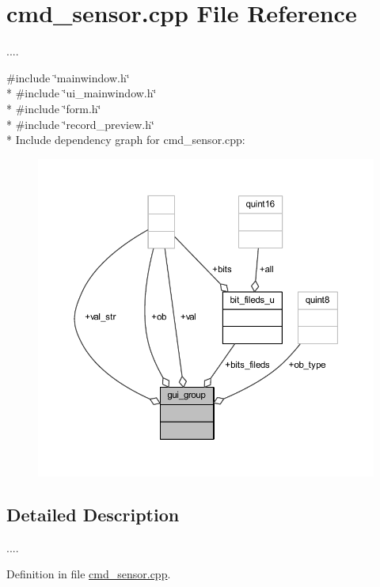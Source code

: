 \hypertarget{a00085}{\section{cmd\+\_\+sensor.\+cpp File Reference}
\label{a00085}
}


....  


{\ttfamily \#include \char`\"{}mainwindow.\+h\char`\"{}}\\*
{\ttfamily \#include \char`\"{}ui\+\_\+mainwindow.\+h\char`\"{}}\\*
{\ttfamily \#include \char`\"{}form.\+h\char`\"{}}\\*
{\ttfamily \#include \char`\"{}record\+\_\+preview.\+h\char`\"{}}\\*
Include dependency graph for cmd\+\_\+sensor.\+cpp\+:
\nopagebreak
\begin{figure}[H]
\begin{center}
\leavevmode
\includegraphics[width=350pt]{d6/db6/a00241}
\end{center}
\end{figure}


\subsection{Detailed Description}
.... 



Definition in file \hyperlink{a00085_source}{cmd\+\_\+sensor.\+cpp}.

